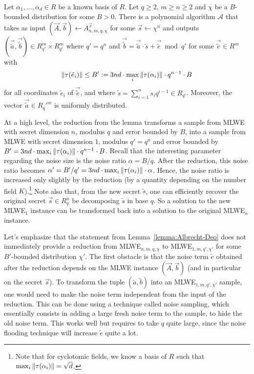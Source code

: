 \begin{lemma}
\label{lemma:Albrecht-Deo}
Let $\alpha_1, \dots, \alpha_d \in R$ be a known basis of $R$.
Let $q \geq 2$, $m \geq n \geq 2$ and $\chi$ be a $B$-bounded distribution for some $B > 0$. There is a polynomial 
algorithm $\mathcal{A}$ that takes as input $(\vec A, \vec b) \leftarrow A^{\vec s}_{n,m,q,\chi}$ for some $\vec s \leftarrow \chi^n$ and outputs $(\vec{\tilde{a}}, \vec{\tilde{b}}) \in R_{q'}^m \times R_{q'}^m$ where $q' = q^n$ and $\vec{\tilde{b}} = \vec{\tilde{a}} \cdot \tilde{s} + \vec{\tilde{e}} \bmod q'$ for some $\vec{\tilde{e}} \in R^m$ with 
\[\|\tau(\tilde{e}_i) \| \leq B' := 3nd \cdot \max_i \|\tau(\alpha_i)\| \cdot q^{n-1} \cdot B\] 
for all coordinates $\tilde{e}_i$ of $\vec{\tilde{e}}$, and where $\tilde{s} = \sum_{i=1}^n s_i q^{i-1} \in R_{q'}$. Moreover, the vector $\vec{\tilde{a}} \in R_q'^m$ is uniformly distributed.
\end{lemma}
At a high level, the reduction from the lemma transforms a sample from MLWE with secret dimension $n$, modulus $q$ and error bounded by $B$, into a sample from MLWE with secret dimension $1$, modulus $q' = q^n$ and error bounded by $B' = 3nd\cdot \max_i \|\tau(\alpha_i)\| \cdot q^{n-1} \cdot B$. Recall that the interesting parameter regarding the noise size is the noise ratio $\alpha = B/q$. After the reduction, this noise ratio becomes $\alpha' = B'/q' = 3nd \cdot \max_i \|\tau(\alpha_i)\| \cdot  \alpha$. Hence, the noise ratio is increased only slightly by the reduction (by a quantity depending on the number field $K$).\footnote{Note that for cyclotomic fields, we know a basis of $R$ such that $\max_i \|\tau(\alpha_i)\| = \sqrt{d}$.}
Note also that, from the new secret $\tilde{s}$, one can efficiently recover the original secret $\vec s \in R_{q}^n$ be decomposing $\tilde{s}$ in base $q$. So a solution to the new MLWE$_1$ instance can be transformed back into a solution to the original MLWE$_n$ instance.

Let's emphasize that the statement from Lemma~\ref{lemma:Albrecht-Deo} does not immediately provide a reduction from MLWE$_{n,m,q,\chi}$ to MLWE$_{1,m,q',\chi'}$ for some $B'$-bounded distribution $\chi'$. The first obstacle is that the noise term $\tilde{e}$ obtained after the reduction depends on the MLWE instance $(\vec A, \vec b)$ (and in particular on the secret $\vec s$). To transform the tuple $(\tilde{a}, \tilde{b})$ into an MLWE$_{1,m,q',\chi'}$ sample, one would need to make the noise term independent from the input of the reduction. This can be done using a technique called noise sampling, which essentially consists in adding a large fresh noise term to the sample, to hide the old noise term. This works well but requires to take $q$ quite large, since the noise flooding technique will increase $\tilde{e}$ quite a lot.

